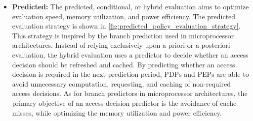 \begin{itemize}
    \item \textbf{Predicted:} The predicted, conditional, or hybrid evaluation aims to optimize evaluation speed, memory utilization, and power efficiency.
    The predicted evaluation strategy is shown in \autoref{fig:predicted_policy_evaluation_strategy}.
    This strategy is inspired by the branch prediction used in microprocessor architectures.
    Instead of relying exclusively upon a priori or a posteriori evaluation, the hybrid evaluation uses a predictor to decide whether an access decision should be refreshed and cached.
    By predicting whether an access decision is required in the next prediction period, PDPs and PEPs are able to avoid unnecessary computation, requesting, and caching of non-required access decisions.
    As for branch predictors in microprocessor architectures, the primary objective of an access decision predictor is the avoidance of cache misses, while optimizing the memory utilization and power efficiency. 
\end{itemize}
